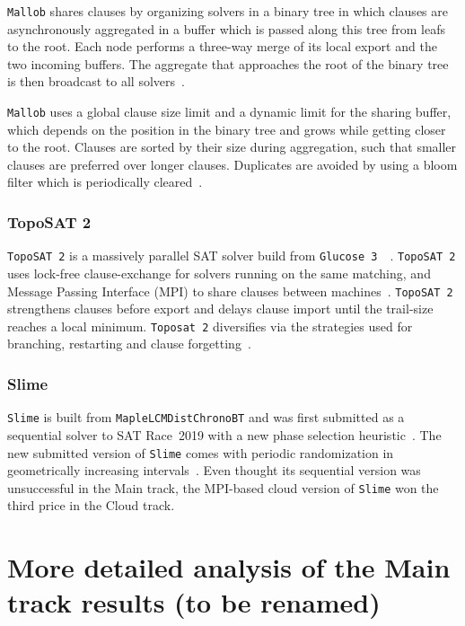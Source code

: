 \documentclass{elsarticle}
\newcommand{\solver}[1]{\texttt{#1}}
\begin{document}
\solver{Mallob} shares clauses by organizing solvers in a binary tree in which clauses are asynchronously aggregated in a buffer which is passed along this tree from leafs to the root. 
Each node performs a three-way merge of its local export and the two incoming buffers. 
The aggregate that approaches the root of the binary tree is then broadcast to all solvers~\cite{Schreiber:SC2020}. 

\solver{Mallob} uses a global clause size limit and a dynamic limit for the sharing buffer, which depends on the position in the binary tree and grows while getting closer to the root. 
Clauses are sorted by their size during aggregation, such that smaller clauses are preferred over longer clauses. 
Duplicates are avoided by using a bloom filter which is periodically cleared~\cite{Schreiber:SC2020}. 


\subsubsection{TopoSAT 2}

\solver{TopoSAT~2} is a massively parallel SAT solver build from \solver{Glucose~3}~\cite{Audemard:2018:Glucose}~\cite{Ehlers:2018:Toposat2}. 
\solver{TopoSAT~2} uses lock-free clause-exchange for solvers running on the same matching, and Message Passing Interface (MPI) to share clauses between machines~\cite{Hamadi:2009:ManySat}. 
\solver{TopoSAT~2} strengthens clauses before export and delays clause import until the trail-size reaches a local minimum. 
\solver{Toposat~2} diversifies via the strategies used for branching, restarting and clause forgetting~\cite{Ehlers:SC2020}. 


\subsubsection{Slime}

\solver{Slime} is built from \solver{MapleLCMDistChronoBT} and was first submitted as a sequential solver to SAT Race~2019 with a new phase selection heuristic~\cite{Riveros:SC2019}. 
The new submitted version of \solver{Slime} comes with periodic randomization in geometrically increasing intervals~\cite{Riveros:SC2020}. 
Even thought its sequential version was unsuccessful in the Main track, the MPI-based cloud version of \solver{Slime} won the third price in the Cloud track. 

\section{More detailed analysis of the Main track results (to be renamed)}
\end{document}
